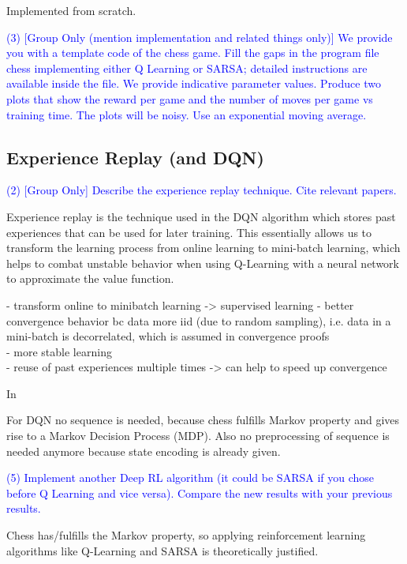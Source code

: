 \documentclass[conference]{IEEEtran}
\begin{document}
Implemented from scratch.

\textcolor{blue}{(3) [Group Only (mention implementation and related things only)] We provide you with a template code of the chess game. Fill the gaps in the
program file chess implementing either Q Learning or SARSA; detailed instructions
are available inside the file. We provide indicative parameter values. Produce two
plots that show the reward per game and the number of moves per game vs training
time. The plots will be noisy. Use an exponential moving average.}



\subsection{Experience Replay (and DQN)}

\textcolor{blue}{(2) [Group Only] Describe the experience replay technique. Cite relevant papers.}

Experience replay is the technique used in the DQN algorithm \cite{atari2013} which stores past experiences that can be used for later training. This essentially allows us to transform the learning process from online learning to mini-batch learning, which helps to combat unstable behavior when using Q-Learning with a neural network to approximate the value function. 

- transform online to minibatch learning -> supervised learning
- better convergence behavior bc data more iid (due to random sampling), i.e. data in a mini-batch is decorrelated, which is assumed in convergence proofs\\
- more stable learning \\
- reuse of past experiences multiple times -> can help to speed up convergence

In 

For DQN no sequence is needed, because chess fulfills Markov property and gives rise to a Markov Decision Process (MDP). Also no preprocessing of sequence is needed anymore because state encoding is already given. \cite{atari2013} \cite{dqn2015}


\textcolor{blue}{(5) Implement another Deep RL algorithm (it could be SARSA if you chose before Q
Learning and vice versa). Compare the new results with your previous results.}

Chess has/fulfills the Markov property, so applying reinforcement learning algorithms like Q-Learning and SARSA is theoretically justified.
\end{document}
